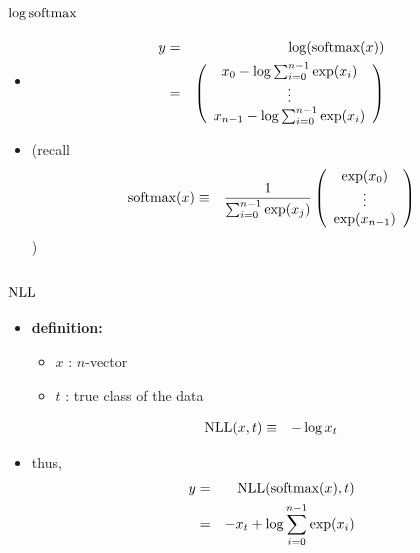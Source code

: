 \documentclass[12pt,dvipdfmx]{beamer}
\newcommand{\ao}[1]{{\color{blue}#1}}
\begin{document}
\begin{frame}
\frametitle{$\log\mbox{softmax}$}
\begin{itemize}
\item []
  \begin{eqnarray*}
y & = & \log(\mbox{softmax}(x)) \\
  & = & 
\left(\begin{array}{c} x_0 - \log\sum_{i=0}^{n-1}\exp(x_i) \\ \vdots \\ x_{n-1} - \log\sum_{i=0}^{n-1}\exp(x_i) \end{array}\right)
\end{eqnarray*}

\item (recall
\begin{eqnarray*}
\mbox{softmax}(x)
& \equiv & 
\frac{1}{\sum_{i=0}^{n-1} \exp(x_j)} \left(\begin{array}{c} \exp(x_0) \\ \vdots \\ \exp(x_{n-1}) \end{array}\right) \\
\end{eqnarray*})

\end{itemize}

\end{frame}

\begin{frame}
  \frametitle{$\mbox{NLL}$}
  \begin{itemize}
  \item \ao{\textbf{definition:}}
    \begin{itemize}
    \item $x$ : $n$-vector
    \item $t$ : true class of the data
    \end{itemize}
    \begin{eqnarray*}
      \mbox{NLL}(x, t)  & \equiv & -\log x_t
    \end{eqnarray*}
  \item thus,
    \begin{eqnarray*}
      y & = & \mbox{NLL} (\mbox{softmax} (x), t) \\
        & = & -x_t + \log\sum_{i=0}^{n-1}\exp(x_i)
    \end{eqnarray*}
  \end{itemize}
\end{frame}
\end{document}
